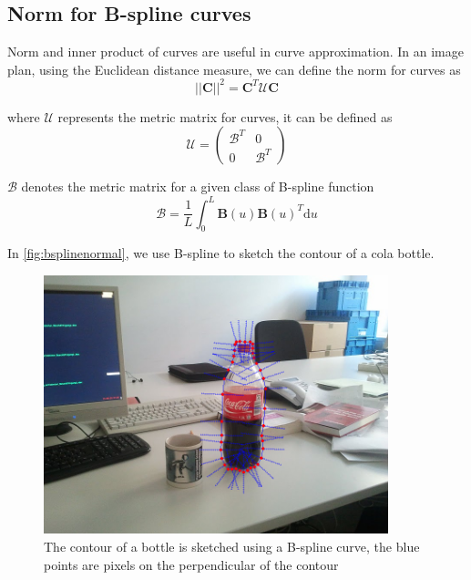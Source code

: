 \subsection{Norm for B-spline curves}
\label{sec:nbc}

Norm and inner product of curves are useful in curve approximation. In
an image plan, using the Euclidean distance measure, we can define the
norm for curves as 
\begin{equation}
  \label{eq:4.13}
  \left| \left| \mathbf{C} \right|\right|^2  = \mathbf{C}^T\mathcal{U}\mathbf{C}
\end{equation}

where $\mathcal{U}$ represents the metric matrix for curves, it can be
defined as 
\begin{equation}
  \label{eq:4.14}
  \mathcal{U} =   \begin{pmatrix}
\mathcal{B}^T & 0 \\
0 &\mathcal{B}^T
  \end{pmatrix}  
\end{equation}

$\mathcal{B}$ denotes the metric matrix for a given class of B-spline
function
\begin{equation}
  \label{eq:4.15}
  \mathcal{B}   = \frac{1}{L} \int_0^L \mathbf{B}(u)\mathbf{B}(u)^T \mathrm{d}u
\end{equation}

In \ref{fig:bsplinenormal}, we use B-spline to sketch the contour of a
cola bottle.
\begin{figure}[htb]
  \centering
  \includegraphics[width=10cm]{images/bsplinenormal.png}
  \caption{The contour of a bottle is sketched using a B-spline
    curve, the blue points are pixels on the perpendicular of the contour}
\label{fig:bspline}
\end{figure}


